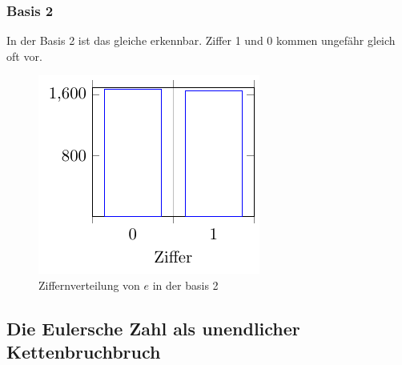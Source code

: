 \subsubsection{Basis 2}
In der Basis 2 ist das gleiche erkennbar. Ziffer 1 und 0 kommen ungefähr gleich oft vor. 
\begin{figure}[h]
  \includegraphics{medien2/basis2/basis2.pdf}
  \centering
  \caption{Ziffernverteilung von $e$ in der basis 2}
\end{figure}

\subsection{Die Eulersche Zahl als unendlicher Kettenbruchbruch}

